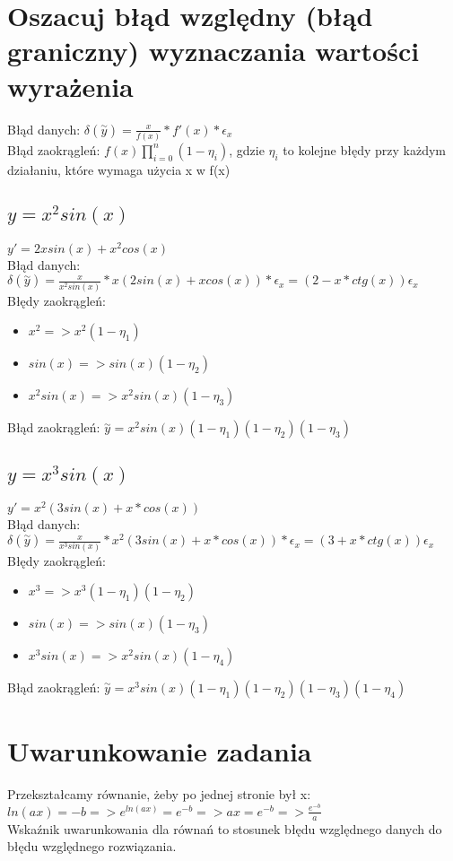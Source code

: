 \documentclass{article}
\begin{document}
\section{Oszacuj błąd względny (błąd graniczny) wyznaczania wartości wyrażenia}
Błąd danych: $\delta(\overset{\sim}{y})=\frac{x}{f(x)}*f'(x)*\epsilon_x$\\
Błąd zaokrągleń: $f(x)\prod_{i=0}^{n}(1-\eta_i)$, gdzie $\eta_i$ to kolejne błędy przy każdym działaniu, które wymaga użycia x w f(x)\\
\subsection{$y=x^2sin(x)$}
$y'=2xsin(x)+x^2cos(x)$\\
Błąd danych: $\delta(\overset{\sim}{y})=\frac{x}{x^2sin(x)}*x(2sin(x)+xcos(x))*\epsilon_x=(2-x*ctg(x))\epsilon_x$\\
Błędy zaokrągleń:
\begin{itemize}
    \item $x^2 => x^2(1-\eta_1)$
    \item $sin(x) => sin(x)(1-\eta_2)$
    \item $x^2sin(x) => x^2sin(x)(1-\eta_3)$
\end{itemize}
Błąd zaokrągleń: $\overset{\sim}{y}=x^2sin(x)(1-\eta_1)(1-\eta_2)(1-\eta_3)$\\

\subsection{$y=x^3sin(x)$}
$y'=x^2(3sin(x)+x*cos(x))$\\
Błąd danych: $\delta(\overset{\sim}{y})=\frac{x}{x^3sin(x)}*x^2(3sin(x)+x*cos(x))*\epsilon_x=(3+x*ctg(x))\epsilon_x$\\
Błędy zaokrągleń:
\begin{itemize}
    \item $x^3 => x^3(1-\eta_1)(1-\eta_2)$
    \item $sin(x) => sin(x)(1-\eta_3)$
    \item $x^3sin(x) => x^2sin(x)(1-\eta_4)$
\end{itemize}
Błąd zaokrągleń: $\overset{\sim}{y}=x^3sin(x)(1-\eta_1)(1-\eta_2)(1-\eta_3)(1-\eta_4)$\\
\section{Uwarunkowanie zadania}
Przekształcamy równanie, żeby po jednej stronie był x:\\
$ln(ax)=-b => e^{ln(ax)}=e^{-b} => ax = e^{-b} => \frac{e^{-b}}{a}$\\
Wskaźnik uwarunkowania dla równań to stosunek błędu względnego danych do błędu względnego rozwiązania.
\end{document}
